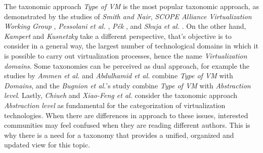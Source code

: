 	The taxonomic approach \textit{Type of VM} is the most popular taxonomic approach, as demonstrated by the studies of \textit{Smith and Nair}, \textit{SCOPE Alliance Virtualization Working Group} \cite{SCOPEAlliance2008}, \textit{Pessolani et al.} \cite{Pessolani2012}, \textit{P{\'e}k} \cite{Pek2013}, and \textit{Shuja et al.} \cite{Shuja2016}. On the other hand, \textit{Kampert} \cite{Kampert2010} and \textit{Kusnetzky} \cite{Kusnetzky2011} take a different perspective, that's objective is to consider in a general way, the largest number of technological domains in which it is possible to carry out virtualization processes, hence the name \textit{Virtualization domains}. Some taxonomies can be perceived as dual approach, for example the studies by \textit{Ammen et al.} \cite{Ameen2013} and \textit{Abdulhamid et al.} \cite{Abdulhamid2014} combine \textit{Type of VM} with \textit{Domains}, and the \textit{Bugnion et al.}'s study \cite{Bugnion2017} combine \textit{Type of VM} with \textit{Abstraction level}. Lastly, \textit{Chiueh} \cite{Chiueh2005} and \textit{Xiao-Feng et al.} \cite{Xiao-Feng2016} consider the taxonomic approach \textit{Abstraction level} as fundamental for the categorization of virtualization technologies. When there are differences in approach to these issues, interested communities may feel confused when they are reading different authors. This is why there is a need for a taxonomy that provides a unified, organized and updated view for this topic.
	

	

	
	
